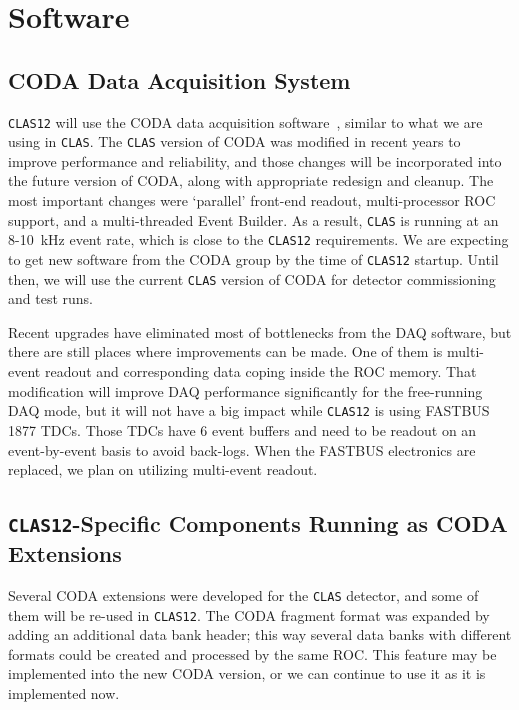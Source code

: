 \section{Software}
\label{sec:software}

\subsection{CODA Data Acquisition System}

{\tt CLAS12} will use the CODA data acquisition software~\cite{coda}, similar 
to what we are using in {\tt CLAS}.  The {\tt CLAS} version of CODA was 
modified in recent years to improve performance and reliability, and those 
changes will be incorporated into the future version of CODA, along with 
appropriate redesign and cleanup.  The most important changes were `parallel' 
front-end readout, multi-processor ROC support, and a multi-threaded Event 
Builder.  As a result, {\tt CLAS} is running at an 8-10~kHz event rate, 
which is close to the {\tt CLAS12} requirements.  We are expecting to get 
new software from the CODA group by the time of {\tt CLAS12} startup.  Until
then, we will use the current {\tt CLAS} version of CODA for detector 
commissioning and test runs.

Recent upgrades have eliminated most of bottlenecks from the DAQ software, but 
there are still places where improvements can be made.  One of them is 
multi-event readout and corresponding data coping inside the ROC memory. 
That modification will improve DAQ performance significantly for the 
free-running DAQ mode, but it will not have a big impact while {\tt CLAS12}
is using FASTBUS 1877 TDCs. Those TDCs have 6 event buffers and need to be
readout on an event-by-event basis to avoid back-logs.  When the FASTBUS 
electronics are replaced, we plan on utilizing multi-event readout.

\subsection{{\tt CLAS12}-Specific Components Running as CODA Extensions}

Several CODA extensions were developed for the {\tt CLAS} detector, and some 
of them will be re-used in {\tt CLAS12}.  The CODA fragment format was 
expanded by adding an additional data bank header; this way several data 
banks with different formats could be created and processed by the same ROC. 
This feature may be implemented into the new CODA version, or we can continue
to use it as it is implemented now.

